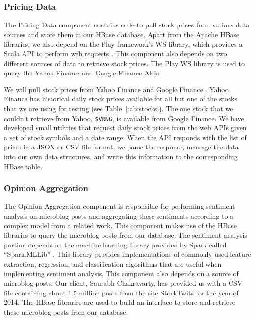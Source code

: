 \subsubsection{Pricing Data}

The Pricing Data component contains code to pull stock prices from various data sources and store them in our HBase database.
Apart from the Apache HBase libraries, we also depend on the Play framework's \cite{playframework} WS library, which provides a Scala API to perform web requests \cite{playws}.
This component also depends on two different sources of data to retrieve stock prices.
The Play WS library is used to query the Yahoo Finance and Google Finance APIs.

We will pull stock prices from Yahoo Finance \cite{yahoofinance} and Google Finance \cite{googlefinance}.
Yahoo Finance has historical daily stock prices available for all but one of the stocks that we are using for testing (see Table~\ref{tab:stocks}).
The one stock that we couldn't retrieve from Yahoo, \texttt{\$VRNG}, is available from Google Finance.
We have developed small utilities that request daily stock prices from the web APIs given a set of stock symbols and a date range.
When the API responds with the list of prices in a JSON \cite{json} or CSV \cite{csv} file format, we parse the response, massage the data into our own data structures, and write this information to the corresponding HBase table.

\subsubsection{Opinion Aggregation}

The Opinion Aggregation component is responsible for performing sentiment analysis on microblog posts and aggregating these sentiments according to a complex model from a related work.
This component makes use of the HBase libraries to query the microblog posts from our database.
The sentiment analysis portion depends on the machine learning library provided by Spark called ``Spark.MLLib'' \cite{sparkml}.
This library provides implementations of commonly used feature extraction, regression, and classification algorithms that are useful when implementing sentiment analysis.
This component also depends on a source of microblog posts.
Our client, Saurabh Chakravarty, has provided us with a CSV file containing about 1.5 million posts from the site StockTwits \cite{stocktwits} for the year of 2014.
The HBase libraries are used to build an interface to store and retrieve these microblog posts from our database.

